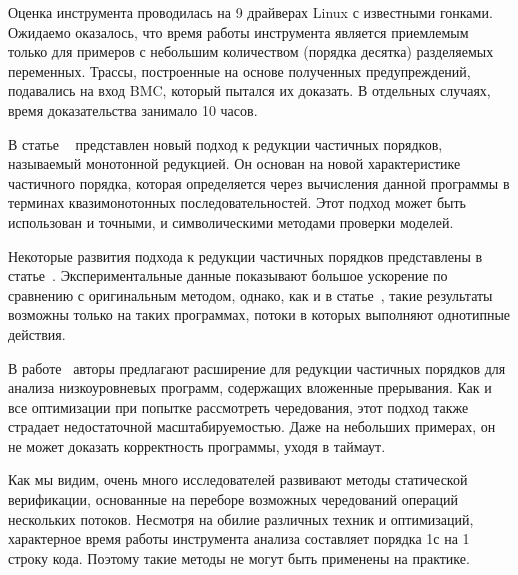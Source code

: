 Оценка инструмента проводилась на 9 драйверах Linux с известными гонками. Ожидаемо оказалось, что время работы инструмента является приемлемым только для примеров с небольшим количеством (порядка десятка) разделяемых переменных.
Трассы, построенные на основе полученных предупреждений, подавались на вход BMC, который пытался их доказать. В отдельных случаях, время доказательства занимало 10 часов. 

В статье ~\cite{Kahlon:2009} представлен новый подход к редукции частичных порядков, называемый монотонной редукцией.
Он основан на новой характеристике частичного порядка, которая определяется через вычисления данной программы в терминах квазимонотонных последовательностей.
Этот подход может быть использован и точными, и символическими методами проверки моделей.

Некоторые развития подхода к редукции частичных порядков представлены в статье~\cite{Abdulla:2014}.
Экспериментальные данные показывают большое ускорение по сравнению с оригинальным методом, однако, как и в статье~\cite{Basler:2009}, такие результаты возможны только на таких программах, потоки в которых выполняют однотипные действия. 

В работе~\cite{KroeningLMST15} авторы предлагают расширение для редукции частичных порядков для анализа низкоуровневых программ, содержащих вложенные прерывания. 
Как и все оптимизации при попытке рассмотреть чередования, этот подход также страдает недостаточной масштабируемостью. 
Даже на небольших примерах, он не может доказать корректность программы, уходя в таймаут.

Как мы видим, очень много исследователей развивают методы статической верификации, основанные на переборе возможных чередований операций нескольких потоков. 
Несмотря на обилие различных техник и оптимизаций, характерное время работы инструмента анализа составляет порядка 1с на 1 строку кода. 
Поэтому такие методы не могут быть применены на практике.


